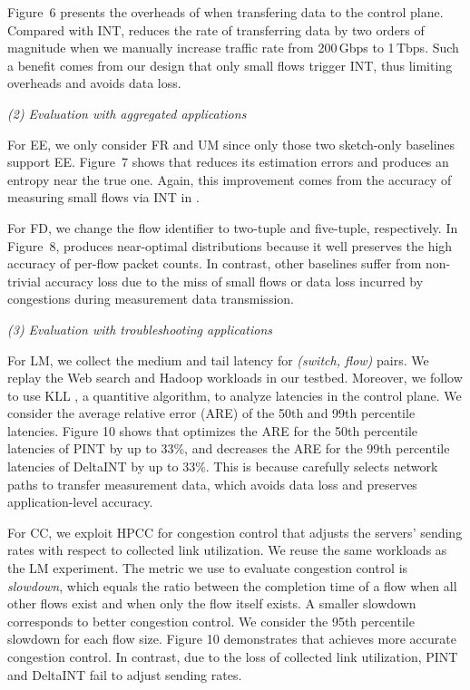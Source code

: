 Figure~6 presents the overheads of \sysname when transfering data to the control plane. Compared with INT, \sysname reduces the rate of transferring data by two orders of magnitude when we manually increase traffic rate from 200\,Gbps to 1\,Tbps. Such a benefit comes from our design that only small flows trigger INT, thus limiting overheads and avoids data loss. 


\noindent \emph{(2) Evaluation with aggregated applications}

For EE, we only consider FR and UM since only those two sketch-only baselines support EE. Figure~7 shows that \sysname reduces its estimation errors and produces an entropy near the true one. Again, this improvement comes from the accuracy of measuring small flows via INT in \sysname. 

For FD, we change the flow identifier to two-tuple and five-tuple, respectively. In Figure~8, \sysname produces near-optimal distributions because it well preserves the high accuracy of per-flow packet counts. In contrast, other baselines suffer from non-trivial accuracy loss due to the miss of small flows or data loss incurred by congestions during measurement data transmission. 

\noindent \emph{(3) Evaluation with troubleshooting applications}

For LM, we collect the medium and tail latency for \emph{(switch, flow)} pairs. We replay the Web search \cite{alizadeh2010data} and Hadoop workloads \cite{roy2015inside} in our testbed. Moreover, we follow \cite{ben2020pint} to use KLL \cite{karnin2016optimal}, a quantitive algorithm, to analyze latencies in the control plane. We consider the average relative error (ARE) of the 50th and 99th percentile latencies. Figure 10 shows that \sysname optimizes the ARE for the 50th percentile latencies of PINT by up to 33\%, and decreases the ARE for the 99th percentile latencies of DeltaINT by up to 33\%. This is because \sysname carefully selects network paths to transfer measurement data, which avoids data loss and preserves application-level accuracy.

For CC, we exploit HPCC \cite{li2019hpcc} for congestion control that adjusts the servers' sending rates with respect to collected link utilization. We reuse the same workloads as the LM experiment. The metric we use to evaluate congestion control is \emph{slowdown}, which equals the ratio between the completion time of a flow when all other flows exist and when only the flow itself exists. A smaller slowdown corresponds to better congestion control. We consider the 95th percentile slowdown for each flow size. Figure 10 demonstrates that \sysname achieves more accurate congestion control. In contrast, due to the loss of collected link utilization, PINT and DeltaINT fail to adjust sending rates. 

